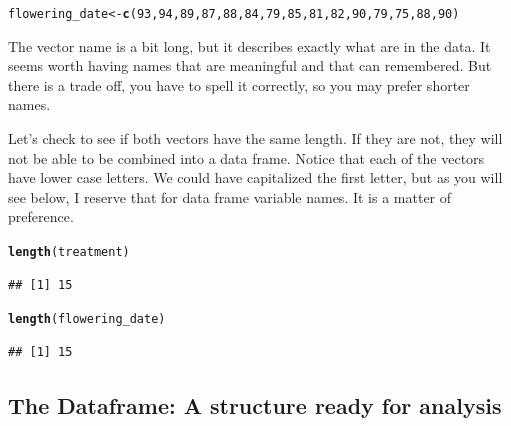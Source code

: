 \documentclass{tufte-handout}\usepackage[]{graphicx}\usepackage[]{color}
\makeatletter
\newcommand{\hlnum}[1]{\textcolor[rgb]{0.686,0.059,0.569}{#1}}%
\newcommand{\hlstd}[1]{\textcolor[rgb]{0.345,0.345,0.345}{#1}}%
\newcommand{\hlkwb}[1]{\textcolor[rgb]{0.69,0.353,0.396}{#1}}%
\newcommand{\hlkwd}[1]{\textcolor[rgb]{0.737,0.353,0.396}{\textbf{#1}}}%
\newenvironment{kframe}{%
 \def\at@end@of@kframe{}%
 \ifinner\ifhmode%
  \def\at@end@of@kframe{\end{minipage}}%
  \begin{minipage}{\columnwidth}%
 \fi\fi%
 \def\FrameCommand##1{\hskip\@totalleftmargin \hskip-\fboxsep
 \colorbox{shadecolor}{##1}\hskip-\fboxsep
     \hskip-\linewidth \hskip-\@totalleftmargin \hskip\columnwidth}%
 \MakeFramed {\advance\hsize-\width
   \@totalleftmargin\z@ \linewidth\hsize
   \@setminipage}}%
 {\par\unskip\endMakeFramed%
 \at@end@of@kframe}
\newenvironment{knitrout}{}{} %
\makeatother
\begin{document}
\begin{fullwidth}
\begin{knitrout}
\color{fgcolor}\begin{kframe}
\begin{alltt}
\hlstd{flowering_date} \hlkwb{<-} \hlkwd{c}\hlstd{(}\hlnum{93}\hlstd{,} \hlnum{94}\hlstd{,} \hlnum{89}\hlstd{,} \hlnum{87}\hlstd{,} \hlnum{88}\hlstd{,} \hlnum{84}\hlstd{,} \hlnum{79}\hlstd{,} \hlnum{85}\hlstd{,} \hlnum{81}\hlstd{,} \hlnum{82}\hlstd{,} \hlnum{90}\hlstd{,} \hlnum{79}\hlstd{,} \hlnum{75}\hlstd{,} \hlnum{88}\hlstd{,} \hlnum{90}\hlstd{)}
\end{alltt}
\end{kframe}
\end{knitrout}
\end{fullwidth}



The vector name is a bit long, but it describes exactly what are in the data. It seems worth having names that are meaningful and that can remembered. But there is a trade off, you have to spell it correctly, so you may prefer shorter names. 

Let's check to see if both vectors have the same length. If they are not, they will not be able to be combined into a data frame. Notice that each of the vectors have lower case letters. We could have capitalized the first letter, but as you will see below, I reserve that for data frame variable names. It is a matter of preference.

\begin{knitrout}
\color{fgcolor}\begin{kframe}
\begin{alltt}
\hlkwd{length}\hlstd{(treatment)}
\end{alltt}
\begin{verbatim}
## [1] 15
\end{verbatim}
\begin{alltt}
\hlkwd{length}\hlstd{(flowering_date)}
\end{alltt}
\begin{verbatim}
## [1] 15
\end{verbatim}
\end{kframe}
\end{knitrout}

\subsection{The Dataframe: A structure ready for analysis}
\end{document}
